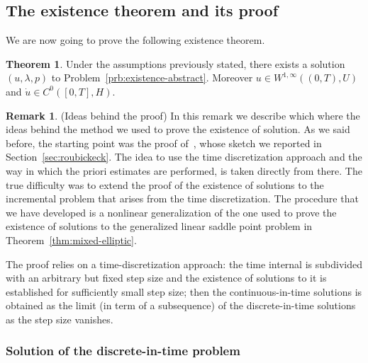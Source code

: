 \documentclass[a4paper,10pt,oneside]{amsbook}
\numberwithin{section}{chapter}
\numberwithin{equation}{chapter}
\theoremstyle{definition}
\newtheorem{thm}[prop]{Theorem}
\newtheorem{rmk}[prop]{Remark}
\begin{document}
\subsection{The existence theorem and its proof}

We are now going to prove the following existence theorem.
\begin{thm}
\label{thm:abstract-existence}
Under the assumptions previously stated, there exists a solution $(u,\lambda,p)$ to Problem~\ref{prb:existence-abstract}. Moreover $u\in W^{1,\infty}((0,T),U)$ and $\dot u\in C^0([0,T],H)$.
\end{thm}
\begin{rmk}(Ideas behind the proof)
In this remark we describe which where the ideas behind the method we used to prove the existence of solution. As we said before, the starting point was the proof of~\cite[Proposition~11.1]{roubicek-pde}, whose sketch we reported in Section~\ref{sec:roubickeck}. The idea to use the time discretization approach and the way in which the priori estimates are performed, is taken directly from there. The true difficulty was to extend the proof of the existence of solutions to the incremental problem that arises from the time discretization. The procedure that we have developed is a nonlinear generalization of the one used to prove the existence of solutions to the generalized linear saddle point problem in Theorem~\ref{thm:mixed-elliptic}.
\end{rmk}

The proof relies on a time-discretization approach: the time internal is subdivided with an arbitrary but fixed step size and the existence of solutions to it is established for sufficiently small step size; then the continuous-in-time solutions is obtained as the limit (in term of a subsequence) of the discrete-in-time solutions as the step size vanishes.

\subsubsection*{Solution of the discrete-in-time problem}
\end{document}
